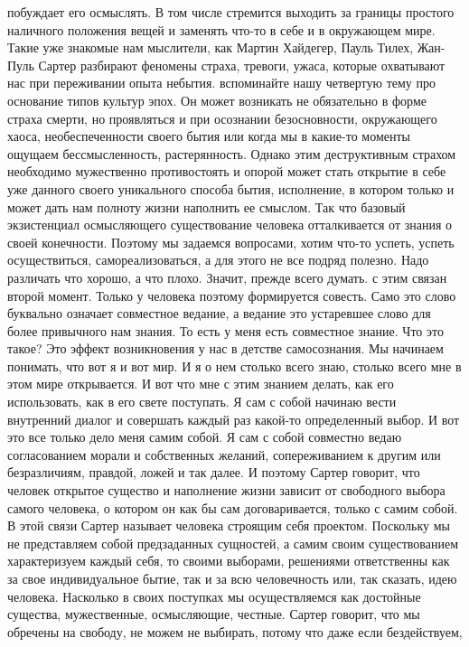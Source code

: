 побуждает его осмыслять. В том числе стремится выходить за границы простого
наличного положения вещей и заменять что-то в себе и в окружающем мире. Такие
уже знакомые нам мыслители, как Мартин Хайдегер, Пауль Тилех, Жан-Пуль Сартер
разбирают феномены страха, тревоги, ужаса, которые охватывают нас при
переживании опыта небытия. вспоминайте нашу четвертую тему про основание типов
культур эпох. Он может возникать не обязательно в форме страха смерти, но
проявляться и при осознании безосновности, окружающего хаоса, необеспеченности
своего бытия или когда мы в какие-то моменты ощущаем бессмысленность,
растерянность. Однако этим деструктивным страхом необходимо мужественно
противостоять и опорой может стать открытие в себе уже данного своего
уникального способа бытия, исполнение, в котором только и может дать нам полноту
жизни наполнить ее смыслом. Так что базовый экзистенциал осмысляющего
существование человека отталкивается от знания о своей конечности. Поэтому мы
задаемся вопросами, хотим что-то успеть, успеть осуществиться,
самореализоваться, а для этого не все подряд полезно. Надо различать что хорошо,
а что плохо. Значит, прежде всего думать. с этим связан второй момент. Только у
человека поэтому формируется совесть. Само это слово буквально означает
совместное ведание, а ведание это устаревшее слово для более привычного нам
знания. То есть у меня есть совместное знание. Что это такое? Это эффект
возникновения у нас в детстве самосознания. Мы начинаем понимать, что вот я и
вот мир. И я о нем столько всего знаю, столько всего мне в этом мире
открывается. И вот что мне с этим знанием делать, как его использовать, как в
его свете поступать. Я сам с собой начинаю вести внутренний диалог и совершать
каждый раз какой-то определенный выбор. И вот это все только дело меня самим
собой. Я сам с собой совместно ведаю согласованием морали и собственных желаний,
сопереживанием к другим или безразличиям, правдой, ложей и так далее. И поэтому
Сартер говорит, что человек открытое существо и наполнение жизни зависит от
свободного выбора самого человека, о котором он как бы сам договаривается,
только с самим собой. В этой связи Сартер называет человека строящим себя
проектом. Поскольку мы не представляем собой предзаданных сущностей, а самим
своим существованием характеризуем каждый себя, то своими выборами, решениями
ответственны как за свое индивидуальное бытие, так и за всю человечность или,
так сказать, идею человека. Насколько в своих поступках мы осуществляемся как
достойные существа, мужественные, осмысляющие, честные. Сартер говорит, что мы
обречены на свободу, не можем не выбирать, потому что даже если бездействуем,

